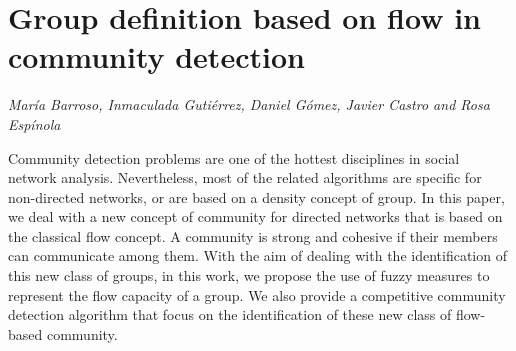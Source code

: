 \documentclass[../booklet.tex]{subfiles}
\begin{document}
\section[Group definition based on flow in community detection. {\it María Barroso, Inmaculada Gutiérrez, Daniel Gómez, Javier Castro and Rosa Espínola}]{Group definition based on flow in community detection}
    

\begin{center}
  {\it María Barroso, Inmaculada Gutiérrez, Daniel Gómez, Javier Castro and Rosa Espínola}
\end{center}

\vskip 0.8cm



Community detection problems are one of the hottest disciplines in social network analysis. Nevertheless, most of the related algorithms are specific for non-directed networks, or are based on a density concept of group. In this paper, we deal with a new concept of community for directed networks that is based on the classical flow concept.  A community is strong and cohesive if their members can communicate among them. With the aim of dealing with the identification of this new class of groups, in this work, we propose the use of fuzzy measures to represent the flow capacity of a group. We also provide a competitive community detection algorithm that focus on the identification of these new class of flow-based community. 
\color{black}

\end{document}
